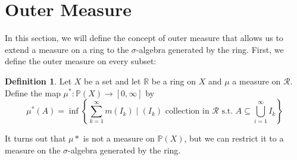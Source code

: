 \documentclass[a4paper, openany]{memoir}
\theoremstyle{definition}
\newtheorem{definition}{Definition}[section]
\theoremstyle{plain}
\begin{document}
    \section{Outer Measure}
    In this section, we will define the concept of outer measure that allows us to extend a measure on a ring to the $\sigma$-algebra generated by the ring. First, we define the outer measure on every subset:
    \begin{definition}
        Let $X$ be a set and let $\mathbb{R}$ be a ring on $X$ and $\mu$ a measure on $\mathcal{R}$. Define the map $\mu^* \colon \mathbb{P}(X) \to [0, \infty]$ by
        \[\mu^*(A) = \inf \left\{\sum_{k=1}^\infty m(I_k) \mid (I_k) \textrm{ collection in } \mathcal{R} \textrm{ s.t. } A \subseteq \bigcup_{i=1}^\infty I_k \right\}\]
    \end{definition}
    \noindent It turns out that $\mu*$ is not a measure on $\mathbb{P}(X)$, but we can restrict it to a measure on the $\sigma$-algebra generated by the ring. 
    
\end{document}
